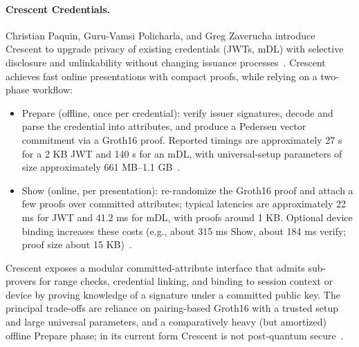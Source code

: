 \paragraph{Crescent Credentials.}
Christian Paquin, Guru-Vamsi Policharla, and Greg Zaverucha introduce Crescent to upgrade privacy of existing credentials (JWTs, mDL) with selective disclosure and unlinkability without changing issuance processes~\cite{cryptoeprint:2024/2013}. Crescent achieves fast online presentations with compact proofs, while relying on a two-phase workflow:
\begin{itemize}
  \item Prepare (offline, once per credential): verify issuer signatures, decode and parse the credential into attributes, and produce a Pedersen vector commitment via a Groth16 proof. Reported timings are approximately 27 s for a 2 KB JWT and 140 s for an mDL, with universal-setup parameters of size approximately 661 MB–1.1 GB~\cite[\S4]{cryptoeprint:2024/2013}.
  \item Show (online, per presentation): re-randomize the Groth16 proof and attach a few proofs over committed attributes; typical latencies are approximately 22 ms for JWT and 41.2 ms for mDL, with proofs around 1 KB. Optional device binding increases these costs (e.g., about 315 ms Show, about 184 ms verify; proof size about 15 KB)~\cite[\S4]{cryptoeprint:2024/2013}.
\end{itemize}
Crescent exposes a modular committed-attribute interface that admits sub-provers for range checks, credential linking, and binding to session context or device by proving knowledge of a signature under a committed public key. The principal trade-offs are reliance on pairing-based Groth16 with a trusted setup and large universal parameters, and a comparatively heavy (but amortized) offline Prepare phase; in its current form Crescent is not post-quantum secure~\cite{groth2016size}.

